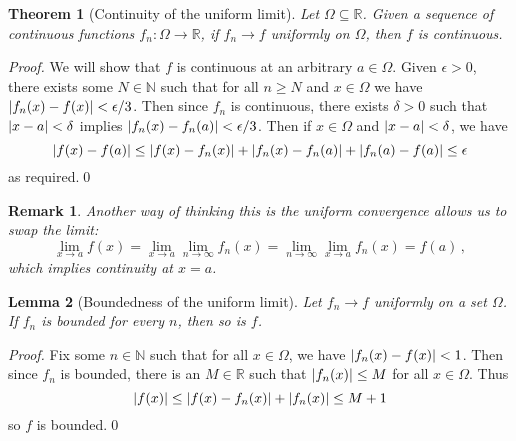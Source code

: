 \documentclass{article}
\theoremstyle{plain}\theoremheaderfont{\normalfont\itshape}\theorembodyfont{\rmfamily}\theoremseparator{.}\newtheorem*{rem}{Remark}\newtheorem*{ex}{Example}\newtheorem*{proof}{Proof}\newtheorem*{altp}{Alternative proof}
\theoremstyle{plain}\theoremheaderfont{\normalfont\bfseries}\theorembodyfont{\rmfamily}\theoremseparator{.}\newtheorem{thm}{Theorem}[section]\newtheorem{lem}[thm]{Lemma}\newtheorem{prop}[thm]{Proposition}\newtheorem*{cor}{Corollary}\newtheorem{defn}[thm]{Definition}\newtheorem{clm}[thm]{Claim}\newtheorem{clminproof}{Claim}
\theoremstyle{break}\theoremheaderfont{\normalfont\itshape}\theorembodyfont{\rmfamily}\theoremseparator{.\medskip}\newtheorem*{proofskip}{Proof}\newtheorem*{exs}{Examples}\newtheorem*{rems}{Remarks}
\theoremstyle{break}\theoremheaderfont{\normalfont\bfseries}\theorembodyfont{\rmfamily}\theoremseparator{.\medskip}\newtheorem{lemskip}[thm]{Lemma}\newtheorem{defnskip}[thm]{Definition}\newtheorem{propskip}[thm]{Proposition}\newtheorem{thmskip}[thm]{Theorem}
\newcommand{\qed}{\hfill\ensuremath{\Box}}
\begin{document}
    \begin{thm}[Continuity of the uniform limit]
        Let \(\Omega\subseteq\mathbb{R}\). Given a sequence of continuous functions \(f_n:\Omega\to\mathbb{R}\), if \(f_n\to f\) uniformly on \(\Omega\), then \(f\) is continuous.
    \end{thm}
    \begin{proof}
        We will show that \(f\) is continuous at an arbitrary \(a\in\Omega\). Given \(\epsilon>0\), there exists some \(N\in\mathbb{N}\) such that for all \(n\ge N\) and \(x\in\Omega\) we have \(\abs{f_n(x)-f(x)}<\epsilon/3\). Then since \(f_n\) is continuous, there exists \(\delta>0\) such that \(\abs{x-a}<\delta\) implies \(\abs{f_n(x)-f_n(a)}<\epsilon/3\). Then if \(x\in \Omega\) and \(\abs{x-a}<\delta\), we have
        \[\abs{f(x)-f(a)}\le\abs{f(x)-f_n(x)}+\abs{f_n(x)-f_n(a)}+\abs{f_n(a)-f(a)}\le\epsilon\]
        as required.\qed
    \end{proof}
    \begin{rem}
        Another way of thinking this is the uniform convergence allows us to swap the limit:
        \[\lim_{x\to a}f(x)=\lim_{x\to a}\lim_{n\to\infty}f_n(x)=\lim_{n\to\infty}\lim_{x\to a}f_n(x)=f(a)\,,\]
        which implies continuity at \(x=a\).
    \end{rem}

    \begin{lem}[Boundedness of the uniform limit]
        Let \(f_n\to f\) uniformly on a set \(\Omega\). If \(f_n\) is bounded for every \(n\), then so is \(f\).
    \end{lem}
    \begin{proof}
        Fix some \(n\in\mathbb{N}\) such that for all \(x\in\Omega\), we have \(\abs{f_n(x)-f(x)}<1\). Then since \(f_n\) is bounded, there is an \(M\in\mathbb{R}\) such that \(\abs{f_n(x)}\le M\) for all \(x\in\Omega\). Thus
        \[\abs{f(x)}\le\abs{f(x)-f_n(x)}+\abs{f_n(x)}\le M+1\]
        so \(f\) is bounded.\qed
    \end{proof}
\end{document}
